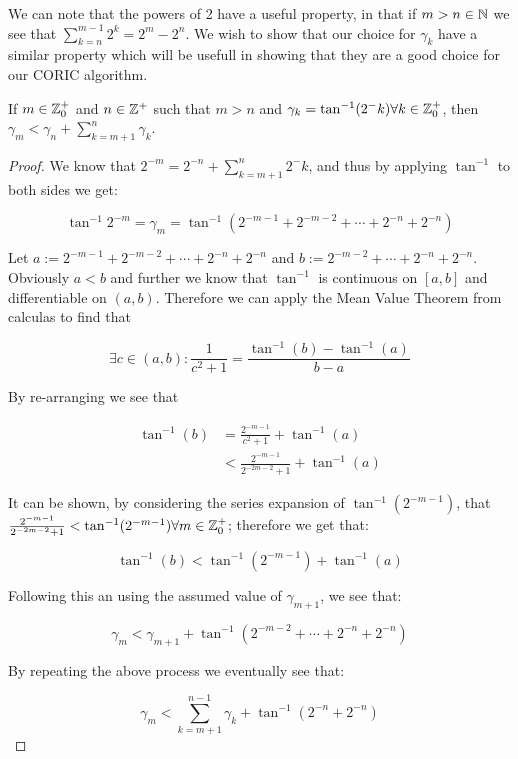 {We can note that the powers of 2 have a useful property, in that if \(m > n \in \mathbb{N}\) we see that \(\sum_{k=n}^{m-1} 2^k = 2^m - 2^n\). We wish to show that our choice for \(\gamma_k\) have a similar property which will be usefull in showing that they are a good choice for our CORIC algorithm.

\begin{Cordic Gamma Property}
\label{THM_"Cordic Gamma Property"}
If \(m \in \mathbb{Z}^+_0\) and \(n \in \mathbb{Z}^+\) such that \(m > n\) and \(\gamma_k = \tan^{-1}(2^-k) \forall k \in \mathbb{Z}^+_0\), then \(\gamma_m < \gamma_n + \sum_{k=m+1}^n \gamma_k\).
\end{Cordic Gamma Property}
\begin{proof}
We know that \(2^{-m} = 2^{-n} + \sum_{k=m+1}^n 2^-k\), and thus by applying \(\tan^{-1}\) to both sides we get:

\[\tan^{-1} 2^{-m} = \gamma_m = \tan^{-1}(2^{-m-1} + 2^{-m-2} + \cdots + 2^{-n} + 2^{-n})\]

Let \(a := 2^{-m-1} + 2^{-m-2} + \cdots + 2^{-n} + 2^{-n}\) and \(b := 2^{-m-2} + \cdots + 2^{-n} + 2^{-n}\). Obviously \(a < b\) and further we know that \(\tan^{-1}\) is continuous on \([a,b]\) and differentiable on \((a,b)\). Therefore we can apply the Mean Value Theorem from calculas to find that 

\[\exists c \in (a,b) : \frac{1}{c^2 + 1} = \frac{\tan^{-1}(b) - \tan^{-1}(a)}{b-a}\]

By re-arranging we see that 

\begin{align*}
	\tan^{-1}(b) &= \frac{2^{-m-1}}{c^2 + 1} + \tan^{-1}(a)\\
		&< \frac{2^{-m-1}}{2^{-2m-2} + 1} + \tan^{-1}(a)
\end{align*}

It can be shown, by considering the series expansion of \(\tan^{-1}(2^{-m-1})\), that \(\frac{2^{-m-1}}{2^{-2m-2} + 1} < \tan^{-1}(2^{-m-1}) \forall m \in \mathbb{Z}^+_0\); therefore we get that:

\[\tan^{-1}(b) < \tan^{-1}(2^{-m-1}) + \tan^{-1}(a)\]

Following this an using the assumed value of \(\gamma_{m+1}\), we see that:

\[\gamma_m < \gamma_{m+1} + \tan^{-1}(2^{-m-2} + \cdots + 2^{-n} + 2^{-n})\]

By repeating the above process we eventually see that:

\[\gamma_m < \sum_{k=m+1}^{n-1} \gamma_k + \tan^{-1}(2^{-n} + 2^{-n})\]


\end{proof}}
